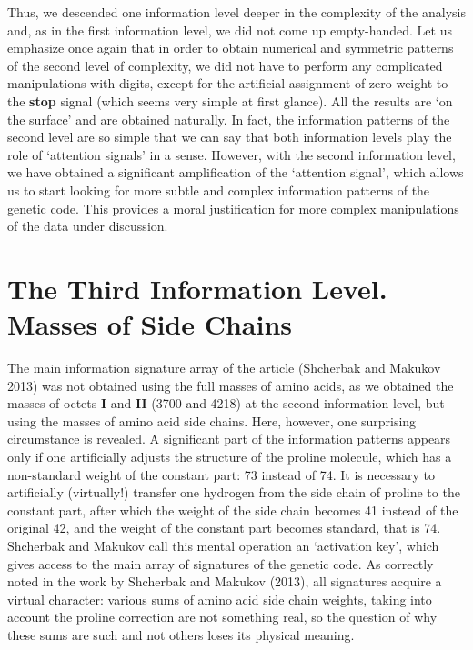 \documentclass[12pt]{article}
\begin{document}
Thus, we descended one information level deeper in the complexity of the analysis and, as in the first information level, we did not come up empty-handed. Let us emphasize once again that in order to obtain numerical and symmetric patterns of the second level of complexity, we did not have to perform any complicated manipulations with digits, except for the artificial assignment of zero weight to the \textbf{stop} signal (which seems very simple at first glance). All the results are `on the surface' and are obtained naturally. In fact, the information patterns of the second level are so simple that we can say that both information levels play the role of `attention signals' in a sense. However, with the second information level, we have obtained a significant amplification of the `attention signal', which allows us to start looking for more subtle and complex information patterns of the genetic code. This provides a moral justification for more complex manipulations of the data under discussion.


\section{The Third Information Level. Masses of Side Chains}

The main information signature array of the article (Shcherbak and Makukov 2013) was not obtained using the full masses of amino acids, as we obtained the masses of octets \textbf{I} and \textbf{II} (3700 and 4218) at the second information level, but using the masses of amino acid side chains. Here, however, one surprising circumstance is revealed. A significant part of the information patterns appears only if one artificially adjusts the structure of the proline molecule, which has a non-standard weight of the constant part: 73 instead of 74. It is necessary to artificially (virtually!) transfer one hydrogen from the side chain of proline to the constant part, after which the weight of the side chain becomes 41 instead of the original 42, and the weight of the constant part becomes standard, that is 74. Shcherbak and Makukov call this mental operation an `activation key', which gives access to the main array of signatures of the genetic code. As correctly noted in the work by Shcherbak and Makukov (2013), all signatures acquire a virtual character: various sums of amino acid side chain weights, taking into account the proline correction are not something real, so the question of why these sums are such and not others loses its physical meaning.
\end{document}
